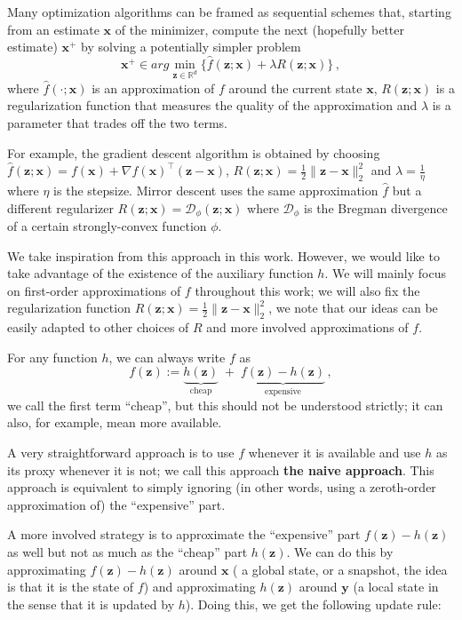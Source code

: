 \documentclass[10pt]{article} %
\theoremstyle{plain}
\theoremstyle{definition}
\theoremstyle{remark}
\newcommand{\norm}[1]{\|#1\|_2}
\def\vx{{\bm{x}}}
\def\vy{{\bm{y}}}
\def\vz{{\bm{z}}}
\newcommand{\R}{\mathbb{R}}
\begin{document}
Many optimization algorithms can be framed as sequential schemes that, starting from an estimate $\vx$ of the minimizer, compute the next (hopefully better estimate) $\vx^+$ by solving a potentially simpler problem 
\begin{equation}
    \vx^+ \in arg\min_{\vz\in\R^d }\{\hat{f}(\vz;\vx) + \lambda R(\vz;\vx)\}\,,
\end{equation}
where $\hat{f}(\cdot;\vx)$ is an approximation of $f$ around the current state $\vx$, $R(\vz;\vx)$ is a regularization function that measures the quality of the approximation and $\lambda$ is a parameter that trades off the two terms. 

For example, the gradient descent algorithm is obtained by choosing $\hat{f}(\vz;\vx)= f(\vx) + \nabla f(\vx)^\top (\vz - \vx)$,  $R(\vz;\vx)=\frac{1}{2}\norm{\vz - \vx}^2$ and $\lambda = \frac{1}{\eta}$ where $\eta$ is the stepsize. Mirror descent uses the same approximation $\hat{f}$ but a different regularizer $R(\vz;\vx) = \mathcal{D}_\phi(\vz;\vx)$ where $\mathcal{D}_\phi$ is the Bregman divergence of a certain strongly-convex function $\phi$.

We take inspiration from this approach in this work. However, we would like to take advantage of the existence of the auxiliary function $h$. We will mainly focus on first-order approximations of $f$ throughout this work; we will also fix the regularization function $R(\vz;\vx)=\frac{1}{2}\norm{\vz - \vx}^2$, we note that our ideas can be easily adapted to other choices of $R$ and more involved approximations of $f$.

For any function $h$, we can always write $f$ as $$f(\vz) :=  \underbrace{h(\vz)}_{\text{cheap}} \; + \; \underbrace{f(\vz) - h(\vz)}_{\text{expensive}}\,,$$
we call the first term ``cheap'', but this should not be understood strictly; it can also, for example, mean more available.

A very straightforward approach is to use $f$ whenever it is available and use $h$ as its proxy whenever it is not; we call this approach \textbf{the naive approach}. This approach is equivalent to simply ignoring (in other words, using a zeroth-order approximation of) the ``expensive'' part.

A more involved strategy is to approximate the ``expensive'' part $f(\vz) - h(\vz)$ as well but not as much as the ``cheap'' part $h(\vz)$. We can do this by approximating $f(\vz)-h(\vz)$ around $\vx$ ( a global state, or a snapshot, the idea is that it is the state of $f$) and approximating $h(\vz)$ around $\vy$ (a local state in the sense that it is updated by $h$). Doing this, we get the following update rule:
\end{document}
